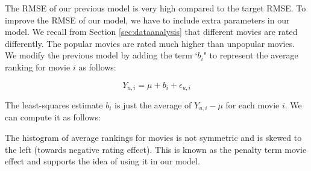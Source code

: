\documentclass[]{article}
\newenvironment{Shaded}{\begin{snugshade}}{\end{snugshade}}
\newcommand{\CommentTok}[1]{\textcolor[rgb]{0.56,0.35,0.01}{\textit{#1}}}
\newcommand{\DataTypeTok}[1]{\textcolor[rgb]{0.13,0.29,0.53}{#1}}
\newcommand{\DecValTok}[1]{\textcolor[rgb]{0.00,0.00,0.81}{#1}}
\newcommand{\KeywordTok}[1]{\textcolor[rgb]{0.13,0.29,0.53}{\textbf{#1}}}
\newcommand{\NormalTok}[1]{#1}
\newcommand{\OperatorTok}[1]{\textcolor[rgb]{0.81,0.36,0.00}{\textbf{#1}}}
\newcommand{\StringTok}[1]{\textcolor[rgb]{0.31,0.60,0.02}{#1}}
\begin{document}
The RMSE of our previous model is very high compared to the target RMSE.
To improve the RMSE of our model, we have to include extra parameters in
our model. We recall from Section \ref{sec:dataanalysis} that different
movies are rated differently. The popular movies are rated much higher
than unpopular movies. We modify the previous model by adding the term
`\(b_{i}\)" to represent the average ranking for movie \(i\) as follows:

\begin{equation}
Y_{u, i} = \mu +b_{i}+ \epsilon_{u, i}
\end{equation}

The least-squares estimate \(b_{i}\) is just the average of
\(Y_{u,i} - \mu\) for each movie \(i\). We can compute it as follows:

\begin{Shaded}
\end{Shaded}

The histogram of average rankings for movies is not symmetric and is
skewed to the left (towards negative rating effect). This is known as
the penalty term movie effect and supports the idea of using it in our
model.

\begin{Shaded}
\end{Shaded}
\end{document}
